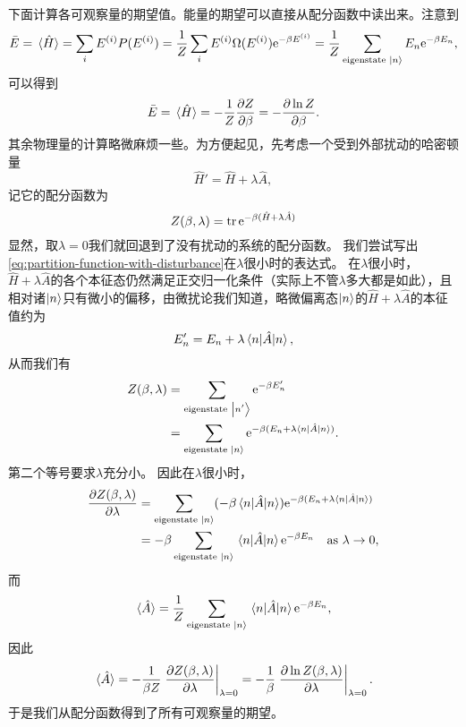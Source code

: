 \documentclass[hyperref, UTF8, a4paper]{ctexart}
\newcommand*{\ee}{\mathrm{e}}
\begin{document}
下面计算各可观察量的期望值。能量的期望可以直接从配分函数中读出来。注意到
\[
    \bar{E} = \expval*{\hat{H}} = \sum_i E^{(i)} P(E^{(i)}) = \frac{1}{Z} \sum_i E^{(i)} \Omega(E^{(i)}) \ee^{- \beta E^{(i)}} = \frac{1}{Z} \sum_\text{eigenstate $\ket{n}$} E_n \ee^{-\beta E_n} ,
\]
可以得到
\begin{equation}
    \bar{E} = \expval*{\hat{H}} = - \frac{1}{Z} \pdv{Z}{\beta} = - \pdv{\ln Z}{\beta}.
    \label{eq:canonical-expectation-of-energy}
\end{equation}
其余物理量的计算略微麻烦一些。为方便起见，先考虑一个受到外部扰动的哈密顿量
\begin{equation}
    \hat{H}' = \hat{H} + \lambda \hat{A},
\end{equation}
记它的配分函数为
\begin{equation}
    Z(\beta, \lambda) = \trace \ee^{-\beta (\hat{H} + \lambda \hat{A})}
    \label{eq:partition-function-with-disturbance}
\end{equation}
显然，取$\lambda = 0$我们就回退到了没有扰动的系统的配分函数。
我们尝试写出\eqref{eq:partition-function-with-disturbance}在$\lambda$很小时的表达式。
在$\lambda$很小时，$\hat{H} + \lambda \hat{A}$的各个本征态仍然满足正交归一化条件（实际上不管$\lambda$多大都是如此），且相对诸$\ket{n}$只有微小的偏移，由微扰论我们知道，略微偏离态$\ket{n}$的$\hat{H} + \lambda \hat{A}$的本征值约为
\[
    E'_n = E_n + \lambda \mel{n}{\hat{A}}{n},
\]
从而我们有
\[
    \begin{aligned}
        Z(\beta, \lambda) &= \sum_{\text{eigenstate $\ket{n'}$}} \ee^{- \beta E'_n} \\
        &= \sum_{\text{eigenstate $\ket{n}$}} \ee^{- \beta (E_n + \lambda \mel{n}{\hat{A}}{n})}.
    \end{aligned}
\]
第二个等号要求$\lambda$充分小。
因此在$\lambda$很小时，
\[
    \begin{aligned}
        \pdv{Z(\beta, \lambda)}{\lambda} &= \sum_{\text{eigenstate $\ket{n}$}} (-\beta \mel{n}{\hat{A}}{n}) \ee^{-\beta (E_n + \lambda \mel{n}{\hat{A}}{n})} \\
        &= - \beta \sum_{\text{eigenstate $\ket{n}$}} \mel{n}{\hat{A}}{n} \ee^{- \beta E_n} \quad \text{as $\lambda \to 0$},
    \end{aligned}
\]
而
\[
    \expval*{\hat{A}} = \frac{1}{Z} \sum_\text{eigenstate $\ket{n}$} \mel{n}{\hat{A}}{n} \ee^{- \beta E_n},
\]
因此
\begin{equation}
    \expval*{\hat{A}} = - \frac{1}{\beta Z} \eval{\pdv{Z(\beta, \lambda)}{\lambda}}_{\lambda = 0} = - \frac{1}{\beta} \eval{\pdv{\ln Z(\beta, \lambda)}{\lambda}}_{\lambda=0}.
    \label{eq:lambda-disturbance}
\end{equation}
于是我们从配分函数得到了所有可观察量的期望。
\end{document}
